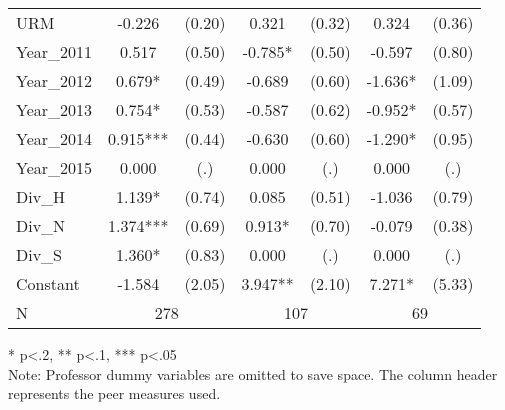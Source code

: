 \begin{sidewaystable}[htb]
\begin{threeparttable}
\begin{tabular}{l|c|c|c|c|c|c}
      URM                 &      -0.226                       &      (0.20)   &       0.321                       &      (0.32)   &       0.324                       &      (0.36)   \\
      Year\_2011   &       0.517                       &      (0.50)   &      -0.785*                      &      (0.50)   &      -0.597                       &      (0.80)   \\
      Year\_2012   &       0.679*                      &      (0.49)   &      -0.689                       &      (0.60)   &      -1.636*                      &      (1.09)   \\
      Year\_2013   &       0.754*                      &      (0.53)   &      -0.587                       &      (0.62)   &      -0.952*                      &      (0.57)   \\
      Year\_2014   &       0.915***                    &      (0.44)   &      -0.630                       &      (0.60)   &      -1.290*                      &      (0.95)   \\
      Year\_2015   &       0.000                       &         (.)   &       0.000                       &         (.)   &       0.000                       &         (.)   \\
      Div\_H         &       1.139*                      &      (0.74)   &       0.085                       &      (0.51)   &      -1.036                       &      (0.79)   \\
      Div\_N         &       1.374***                    &      (0.69)   &       0.913*                      &      (0.70)   &      -0.079                       &      (0.38)   \\
      Div\_S         &       1.360*                      &      (0.83)   &       0.000                       &         (.)   &       0.000                       &         (.)   \\
      Constant            &      -1.584                       &      (2.05)   &       3.947**                     &      (2.10)   &       7.271*                      &      (5.33)   \\
      \hline
      N                 & \multicolumn{2}{|c}{278} & \multicolumn{2}{|c}{107} & \multicolumn{2}{|c}{69}               \\
      \hline
      \hline
    \end{tabular}
    \begin{tablenotes}
    \item{* p<.2, ** p<.1, *** p<.05 \\ Note: Professor dummy variables are omitted to save space. The column header represents the peer measures used.}
    \end{tablenotes}
  \end{threeparttable}
\end{sidewaystable}

